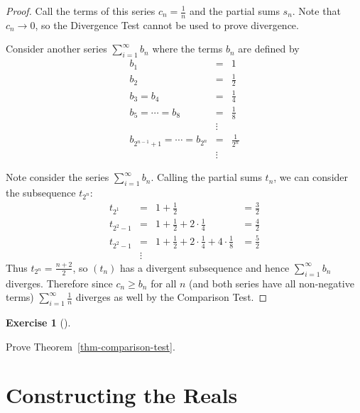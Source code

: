 \documentclass[
  letterpaper,
  DIV=11,
  numbers=noendperiod]{scrreprt}
\theoremstyle{plain}
\theoremstyle{definition}
\newtheorem{exercise}{Exercise}[chapter]
\theoremstyle{plain}
\theoremstyle{plain}
\theoremstyle{definition}
\theoremstyle{definition}
\theoremstyle{remark}
\begin{document}
\begin{proof}
Call the terms of this series \(c_n=\frac{1}{n}\) and the partial sums
\(s_n\). Note that \(c_n\rightarrow0\), so the Divergence Test cannot be
used to prove divergence.

Consider another series \(\displaystyle \sum_{i=1}^\infty b_n\) where
the terms \(b_n\) are defined by \[\begin{array}{rcl}
  b_1&=&1\\
  b_2&=&\frac{1}{2}\\
  b_3=b_4&=&\frac{1}{4}\\
  b_5=\cdots=b_8&=&\frac{1}{8}\\
  &\vdots&\\
  b_{2^{n-1}+1}=\cdots=b_{2^n} & = & \frac{1}{2^n}\\
  &\vdots&
\end{array}\]

Note consider the series \(\displaystyle \sum_{i=1}^\infty b_n\).
Calling the partial sums \(t_n\), we can consider the subsequence
\(t_{2^n}\): \[\begin{array}{rcll}
  t_{2^1} &=& 1+\frac{1}{2}&=\frac{3}{2}\\
  t_{2^2-1} &=& 1+\frac{1}{2}+2\cdot\frac{1}{4}&=\frac{4}{2}\\
  t_{2^2-1} &=& 1+\frac{1}{2}+2\cdot\frac{1}{4}+4\cdot\frac{1}{8}&=\frac{5}{2}\\
  &\vdots&
\end{array}\] Thus \(t_{2^n}=\frac{n+2}{2}\), so \((t_n)\) has a
divergent subsequence and hence \(\displaystyle \sum_{i=1}^\infty b_n\)
diverges. Therefore since \(c_n\geq b_n\) for all \(n\) (and both series
have all non-negative terms)
\(\displaystyle \sum_{i=1}^\infty \frac{1}{n}\) diverges as well by the
Comparison Test.
\end{proof}

\begin{exercise}[]\protect\hypertarget{exr-comp-test-apply}{}\label{exr-comp-test-apply}

Prove Theorem~\ref{thm-comparison-test}.

\end{exercise}


\chapter{Constructing the Reals}\label{constructing-the-reals}
\end{document}
